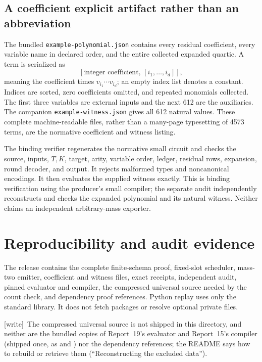 \documentclass[11pt,a4paper]{article}
\numberwithin{equation}{section}
\newcommand{\wtag}{\textup{[write]}}
\begin{document}
\subsection{A coefficient explicit artifact rather than an abbreviation}
The bundled \texttt{example-polynomial.json} contains every residual coefficient, every variable name in declared order, and the entire collected expanded quartic. A term is serialized as
\[
[\text{integer coefficient},\,[i_1,\ldots,i_d]],
\]
meaning the coefficient times $v_{i_1}\cdots v_{i_d}$; an empty index list denotes a constant. Indices are sorted, zero coefficients omitted, and repeated monomials collected. The first three variables are external inputs and the next 612 are the auxiliaries. The companion \texttt{example-witness.json} gives all 612 natural values. These complete machine-readable files, rather than a many-page typesetting of 4573 terms, are the normative coefficient and witness listing.

The binding verifier regenerates the normative small circuit and checks the source, inputs, $T,K$, target, arity, variable order, ledger, residual rows, expansion, round decoder, and output. It rejects malformed types and noncanonical encodings. It then evaluates the supplied witness exactly. This is binding verification using the producer's small compiler; the separate audit independently reconstructs and checks the expanded polynomial and its natural witness. Neither claims an independent arbitrary-mass exporter.

\section{Reproducibility and audit evidence}\label{fpa:eb:sec:replay}
The release contains the complete finite-schema proof, fixed-slot scheduler, mass-two emitter, coefficient and witness files, exact receipts, independent audit, pinned evaluator and compiler, the compressed universal source needed by the count check, and dependency proof references. Python replay uses only the standard library. It does not fetch packages or resolve optional private files.

\wtag\ The compressed universal source  is not shipped in this directory, and neither are the bundled copies of Report~19's evaluator and Report~15's compiler (shipped once, as  and ) nor the dependency references; the README says how to rebuild or retrieve them (``Reconstructing the excluded data'').
\end{document}
